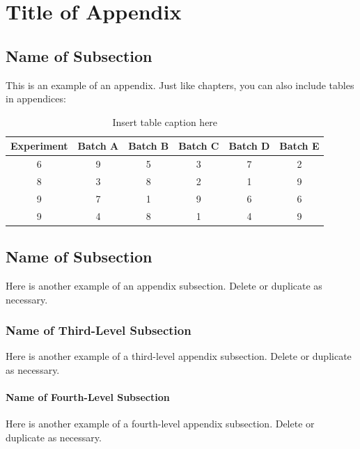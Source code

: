 \chapter{Title of Appendix} %

\section{Name of Subsection}
This is an example of an appendix. Just like chapters, you can also include tables in appendices:

\begin{table}[h]
\caption{Insert table caption here} 
\centering 
\begin{tabular}{c c c c c c} 
\hline\hline 
Experiment & Batch A & Batch B & Batch C & Batch D & Batch E \\ [0.5ex] 
\hline 
6 & 9 & 5 & 3 & 7 & 2 \\
8 & 3 & 8 & 2 & 1 & 9 \\
9 & 7 & 1 & 9 & 6 & 6 \\
9 & 4 & 8 & 1 & 4 & 9 \\ [1ex] 
\hline 
\end{tabular}
\label{table_example_3:nonlin}
\end{table}

\section{Name of Subsection}
Here is another example of an appendix subsection. Delete or duplicate as necessary.

\subsection{Name of Third-Level Subsection}
Here is another example of a third-level appendix subsection. Delete or duplicate as necessary.

\subsubsection{Name of Fourth-Level Subsection}
Here is another example of a fourth-level appendix subsection. Delete or duplicate as necessary.